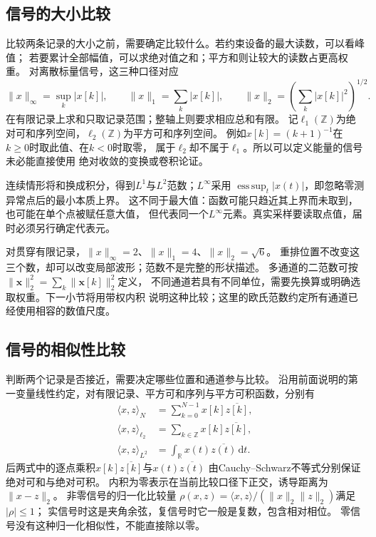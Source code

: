 \subsection{信号的大小比较}

比较两条记录的大小之前，需要确定比较什么。若约束设备的最大读数，可以看峰值；
若要累计全部幅值，可以求绝对值之和；平方和则让较大的读数占更高权重。
对离散标量信号，这三种口径对应
\[
  \|x\|_\infty=\sup_k|x[k]|,\qquad
  \|x\|_1=\sum_k|x[k]|,\qquad
  \|x\|_2=\left(\sum_k|x[k]|^2\right)^{1/2}.
\]
在有限记录上求和只取记录范围；整轴上则要求相应总和有限。
记$\ell_1(\mathbb Z)$为绝对可和序列空间，$\ell_2(\mathbb Z)$为平方可和序列空间。
例如$x[k]=(k+1)^{-1}$在$k\geq0$时取此值、在$k<0$时取零，
属于$\ell_2$却不属于$\ell_1$。所以可以定义能量的信号未必能直接使用
绝对收敛的变换或卷积论证。

连续情形将和换成积分，得到$L^1$与$L^2$范数；$L^\infty$采用
$\operatorname*{ess\,sup}_t|x(t)|$，即忽略零测异常点后的最小本质上界。
这不同于最大值：函数可能只趋近其上界而未取到，也可能在单个点被赋任意大值，
但代表同一个$L^\infty$元素。真实采样要读取点值，届时必须另行确定代表元。

对贯穿有限记录，$\|x\|_\infty=2$、$\|x\|_1=4$、$\|x\|_2=\sqrt6$。
重排位置不改变这三个数，却可以改变局部波形；范数不是完整的形状描述。
多通道的二范数可按
$\|\bm x\|_2^2=\sum_k\|\bm x[k]\|_2^2$定义，
不同通道若具有不同单位，需要先换算或明确选取权重。下一小节将用带权内积
说明这种比较；这里的欧氏范数约定所有通道已经使用相容的数值尺度。

\subsection{信号的相似性比较}

判断两个记录是否接近，需要决定哪些位置和通道参与比较。
沿用前面说明的第一变量线性约定，对有限记录、平方可和序列与平方可积函数，分别有
\begin{equation}
  \begin{aligned}
    \langle x,z\rangle_N&=\sum_{k=0}^{N-1}x[k]\overline{z[k]},\\
    \langle x,z\rangle_{\ell_2}&=\sum_{k\in\mathbb Z}x[k]\overline{z[k]},\\
    \langle x,z\rangle_{L^2}&=\int_{\mathbb R}x(t)\overline{z(t)}\,\mathrm dt.
  \end{aligned}
  \label{eq:signal-inner-products}
\end{equation}
后两式中的逐点乘积$x[k]\overline{z[k]}$与$x(t)\overline{z(t)}$
由Cauchy--Schwarz不等式分别保证绝对可和与绝对可积。
内积为零表示在当前比较口径下正交，诱导距离为$\|x-z\|_2$。
非零信号的归一化比较量
$\rho(x,z)=\langle x,z\rangle/(\|x\|_2\|z\|_2)$满足$|\rho|\leq1$；
实信号时这是夹角余弦，复信号时它一般是复数，包含相对相位。
零信号没有这种归一化相似性，不能直接除以零。

